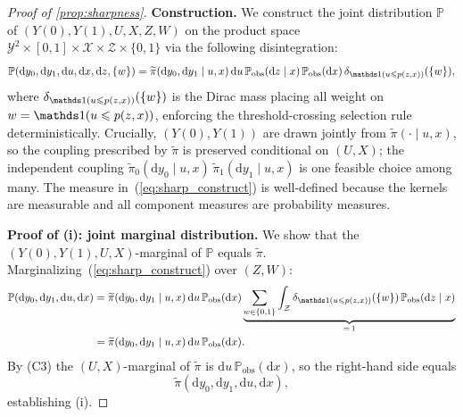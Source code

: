 \begin{proof}[Proof of \cref{prop:sharpness}]
    \medskip
    \noindent\textbf{Construction.}
    We construct the joint distribution $\mathbb{P}$ of $(Y(0), Y(1), U, X, Z, W)$ on the product space $\mathcal{Y}^2 \times [0,1] \times \mathcal{X} \times \mathcal{Z} \times \{0,1\}$ via the following disintegration:
    \begin{equation}\label{eq:sharp_construct}
        \mathbb{P}(\mathrm{d}y_0, \mathrm{d}y_1, \mathrm{d}u, \mathrm{d}x, \mathrm{d}z, \{w\})
        = \tilde{\pi}(\mathrm{d}y_0, \mathrm{d}y_1 \mid u, x) \, \mathrm{d}u \, \mathbb{P}_{\text{obs}}(\mathrm{d}z \mid x) \, \mathbb{P}_{\text{obs}}(\mathrm{d}x) \, \delta_{\indicator(u \leqslant p(z,x))}(\{w\}),
    \end{equation}
    where $\delta_{\indicator(u \leqslant p(z,x))}(\{w\})$ is the Dirac mass placing all weight on $w = \indicator(u \leqslant p(z,x))$, enforcing the threshold-crossing selection rule deterministically. Crucially, $(Y(0), Y(1))$ are drawn jointly from $\tilde{\pi}(\cdot \mid u, x)$, so the coupling prescribed by $\tilde{\pi}$ is preserved conditional on $(U, X)$; the independent coupling $\tilde{\pi}_0(\mathrm{d}y_0 \mid u, x) \, \tilde{\pi}_1(\mathrm{d}y_1 \mid u, x)$ is one feasible choice among many. The measure in~(\ref{eq:sharp_construct}) is well-defined because the kernels are measurable and all component measures are probability measures.

    \medskip
    \noindent\textbf{Proof of (i): joint marginal distribution.}
    We show that the $(Y(0), Y(1), U, X)$-marginal of $\mathbb{P}$ equals $\tilde{\pi}$. Marginalizing~(\ref{eq:sharp_construct}) over $(Z, W)$:
    \begin{align*}
        \mathbb{P}(\mathrm{d}y_0, \mathrm{d}y_1, \mathrm{d}u, \mathrm{d}x)
        &= \tilde{\pi}(\mathrm{d}y_0, \mathrm{d}y_1 \mid u, x) \, \mathrm{d}u \, \mathbb{P}_{\text{obs}}(\mathrm{d}x) \underbrace{\sum_{w \in \{0, 1\}} \int_{\mathcal{Z}} \delta_{\indicator(u \leqslant p(z,x))}(\{w\}) \, \mathbb{P}_{\text{obs}}(\mathrm{d}z \mid x)}_{=\, 1} \\
        &= \tilde{\pi}(\mathrm{d}y_0, \mathrm{d}y_1 \mid u, x) \, \mathrm{d}u \, \mathbb{P}_{\text{obs}}(\mathrm{d}x).
    \end{align*}
    By (C3) the $(U, X)$-marginal of $\tilde{\pi}$ is $\mathrm{d}u \, \mathbb{P}_{\text{obs}}(\mathrm{d}x)$, so the right-hand side equals
    \begin{equation*}
        \tilde{\pi}(\mathrm{d}y_0, \mathrm{d}y_1, \mathrm{d}u, \mathrm{d}x),
    \end{equation*}
    establishing (i).


\end{proof}
